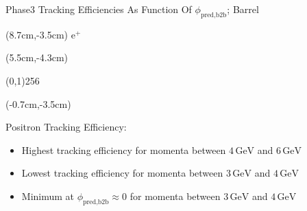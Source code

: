 \documentclass[8pt]{beamer}
\begin{document}
\begin{frame}{Phase3 Tracking Efficiencies As Function Of $\phi_{\textrm{pred,b2b}}$; Barrel}
	\begin{textblock*}{2cm}(8.7cm,-3.5cm)
		$\textrm{e}^+$
	\end{textblock*}
	
	
	
	\begin{textblock*}{11cm}(5.5cm,-4.3cm)
		
		\begin{center}
			\line(0,1){256}
		\end{center}
		
	\end{textblock*}
	
	
	
	
	
	
	
	\pause[4]
	\begin{textblock*}{6cm}(-0.7cm,-3.5cm)
		\begin{mybox}
			Positron Tracking Efficiency:
			\begin{itemize}
				\item<2-> Highest tracking efficiency for momenta between $4\,\textrm{GeV}$ and $6\,\textrm{GeV}$
				\item<3-> Lowest tracking efficiency for momenta between $3\,\textrm{GeV}$ and $4\,\textrm{GeV}$
				\item<5-> Minimum at $\phi_{\textrm{pred,b2b}} \approx 0$ for momenta between $3\,\textrm{GeV}$ and $4\,\textrm{GeV}$
			\end{itemize}
		\end{mybox}
	\end{textblock*}
	

\end{frame}
\end{document}
